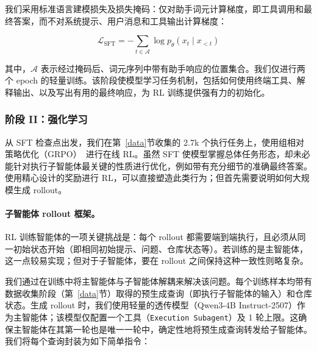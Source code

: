 \documentclass[sigconf,review]{acmart}
\begin{document}
我们采用标准语言建模损失及损失掩码：仅对助手词元计算梯度，即工具调用和最终答案，而不对系统提示、用户消息和工具输出计算梯度：

\begin{equation}
\mathcal{L}_{\text{SFT}} = -\sum_{t \in \mathcal{A}} \log p_\theta(x_t \mid x_{<t})
\label{eq:sft}
\end{equation}

\noindent 其中，$\mathcal{A}$ 表示经过掩码后、词元序列中带有助手响应的位置集合。我们仅进行两个 epoch 的轻量训练。该阶段使模型学习任务机制，包括如何使用终端工具、解释输出、以及写出有用的最终响应，为 RL 训练提供强有力的初始化。

\subsubsection{阶段 II：强化学习}
从 SFT 检查点出发，我们在第~\ref{data}节收集的 2.7k 个执行任务上，使用组相对策略优化（GRPO）~\cite{grpo}进行在线 RL。虽然 SFT 使模型掌握总体任务形态，却未必能针对执行子智能体最关键的性质进行优化，例如带有充分细节的准确最终答案。使用精心设计的奖励进行 RL，可以直接塑造此类行为；但首先需要说明如何大规模生成 rollout。

\paragraph{子智能体 rollout 框架。}
RL 训练智能体的一项关键挑战是：每个 rollout 都需要端到端执行，且必须从同一初始状态开始（即相同初始提示、问题、仓库状态等）。若训练的是主智能体，这一点较易实现；但对于子智能体，要在 rollout 之间保持这种一致性则略复杂。

我们通过在训练中将主智能体与子智能体解耦来解决该问题。每个训练样本均带有数据收集阶段（第~\ref{data}节）取得的预生成查询（即执行子智能体的输入）和仓库状态。生成 rollout 时，我们使用轻量的透传模型（Qwen3-4B Instruct-2507）作为主智能体；该模型仅配置一个工具（\texttt{Execution Subagent}）及 1 轮上限。这确保主智能体在其第一轮也是唯一一轮中，确定性地将预生成查询转发给子智能体。我们将每个查询封装为如下简单指令：
\begin{center}
\small
{}
\end{center}
\end{document}
